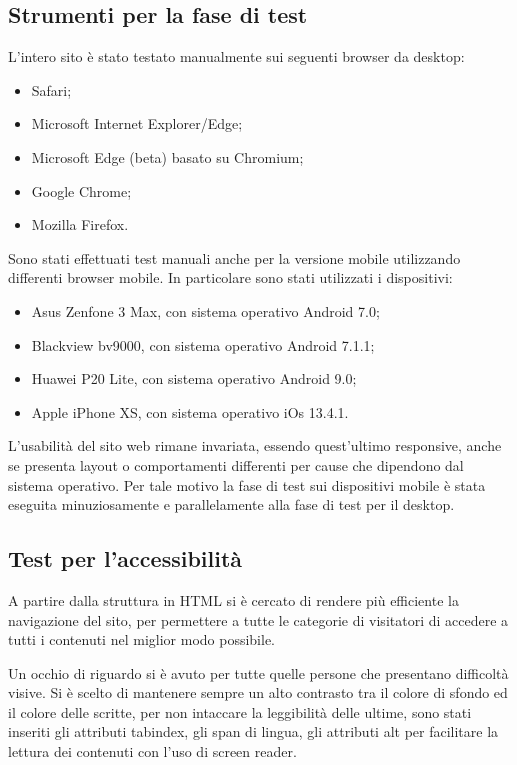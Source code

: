 \subsection{Strumenti per la fase di test}
L'intero sito è stato testato manualmente sui seguenti browser da desktop:
\begin{itemize}
	\item Safari;
	\item Microsoft Internet Explorer/Edge;
	\item Microsoft Edge (beta) basato su Chromium;
	\item Google Chrome;
	\item Mozilla Firefox.
\end{itemize}
Sono stati effettuati test manuali anche per la versione mobile utilizzando differenti browser mobile. In particolare sono stati utilizzati i dispositivi:
\begin{itemize}
	\item Asus Zenfone 3 Max, con sistema operativo Android 7.0;
	\item Blackview bv9000, con sistema operativo Android 7.1.1;
	\item Huawei P20 Lite, con sistema operativo Android 9.0;
	\item Apple iPhone XS, con sistema operativo iOs 13.4.1.
\end{itemize}
L’usabilità del sito web rimane invariata, essendo quest’ultimo responsive, anche se presenta layout o comportamenti differenti per cause che dipendono dal sistema operativo. Per tale motivo la fase di test sui dispositivi mobile è stata eseguita minuziosamente e parallelamente alla fase di test per il desktop.

\subsection{Test per l'accessibilità}
A partire dalla struttura in HTML si è cercato di rendere più efficiente la navigazione del sito, per permettere a tutte le categorie di visitatori di accedere a tutti i contenuti nel miglior modo possibile.

Un occhio di riguardo si è avuto per tutte quelle persone che presentano difficoltà visive. Si è scelto di mantenere sempre un alto contrasto tra il colore di sfondo ed il colore delle scritte, per non intaccare la leggibilità delle ultime, sono stati inseriti gli attributi tabindex, gli span di lingua, gli attributi alt per facilitare la lettura dei contenuti con l'uso di screen reader.\\


